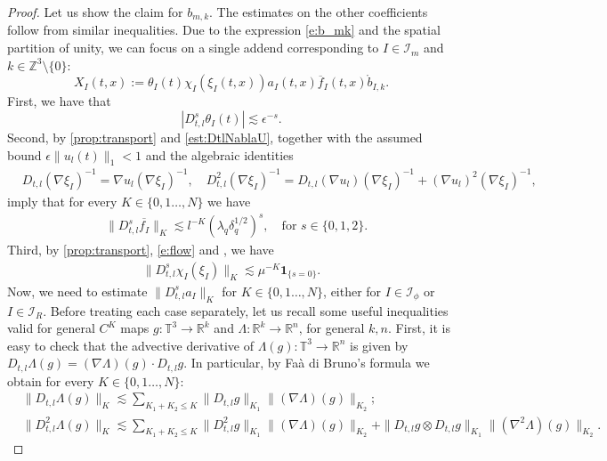 \documentclass[10pt,a4paper]{amsart}
\numberwithin{equation}{section}
\numberwithin{corollario}{section}
\numberwithin{lemma}{section}
\numberwithin{prop}{section}
\theoremstyle{definition}
\theoremstyle{remark}
\newcommand{\Z}{\mathbb{Z}}
\newcommand{\R}{\mathbb{R}}
\newcommand{\T}{\mathbb{T}}
\newcommand{\I}{\mathcal{I}}
\begin{document}
\begin{proof}
    Let us show the claim for $b_{m,k}$. The estimates on the other coefficients follow from similar inequalities.
     Due to the expression \eqref{e:b_mk} and the spatial partition of unity,  we can focus on a single addend corresponding to $I \in \mathcal{I}_m$ and $k \in \Z^3 \setminus \{0\}$: 
     \begin{equation} \label{eq:aux_001}
         X_I(t,x)
     :=
     \theta_I(t)\chi_I(\xi_I(t,x))a_I(t,x)\overline{f}_I(t,x)\mathring{b}_{I,k}.
     \end{equation} 
     First, we have that
     \begin{equation}\label{e:timePart}
         |D_{t,l}^s\theta_I(t)|\lesssim\epsilon^{-s}.
     \end{equation}
     Second, by \autoref{prop:transport} and \eqref{est:DtlNablaU}, together with the assumed bound $\epsilon\|u_l(t)\|_1<1$ and the algebraic identities 
     \begin{align}\label{e:MatDerFlux}
         &D_{t,l}(\nabla \xi_I)^{-1}=\nabla u_l (\nabla\xi_I)^{-1}, \quad D_{t,l}^2(\nabla\xi_I)^{-1}=D_{t,l}(\nabla u_l)(\nabla\xi_I)^{-1}+(\nabla u_l)^2(\nabla\xi_I)^{-1},
     \end{align}
     imply that for every $K \in \{0,1\dots,N\}$ we have
     \begin{align}\label{e:FluxDirection}
         &\|D_{t,l}^s\overline{f_I}\|_K\lesssim l^{-K} (\lambda_q\delta_q^{1/2})^s, \quad \text{for }s\in \{0,1,2\}.
     \end{align}
     Third, by \autoref{prop:transport}, \eqref{e:flow} and \cite[Proposition C.1]{BD15+}, we have
     \begin{align}\label{e:spacePart}
         \|D_{t,l}^s\chi_I(\xi_I)\|_K\lesssim\mu^{-K}\mathbf{1}_{\{s=0\}}.
     \end{align}  
     Now, we need to estimate $\|D_{t,l}^sa_I\|_K$ for $K \in \{0,1\dots,N\}$, either for $I\in \I_{\phi}$ or $I\in\I_{R}$.
     Before treating each case separately, let us recall some useful inequalities valid for general $C^K$ maps $g:\T^3 \to \R^k$ and $\Lambda:\R^k \to \R^n$, for general $k,n$. First, it is easy to check that the advective derivative of $\Lambda(g):\T^3 \to \R^n$ is given by $D_{t,l}\Lambda(g)= (\nabla \Lambda) (g) \cdot D_{t,l}g$. In particular, by Faà di Bruno's formula we obtain for every $K \in \{0,1\dots,N\}$:
     \begin{align}
         &\label{e:comp1} \|D_{t,l}\Lambda(g)\|_K\lesssim\sum_{K_1+K_2\le K}\|D_{t,l}g\|_{K_1}\|(\nabla\Lambda)(g)\|_{K_2};\\
         &\label{e:comp2} \|D_{t,l}^2\Lambda(g)\|_K\lesssim\sum_{K_1+K_2\le K}\|D_{t,l}^2g\|_{K_1}\|(\nabla\Lambda)(g)\|_{K_2}+\|D_{t,l}g\otimes D_{t,l}g\|_{K_1}\|(\nabla^2\Lambda)(g)\|_{K_2}.
     \end{align}


\end{proof}
\end{document}
